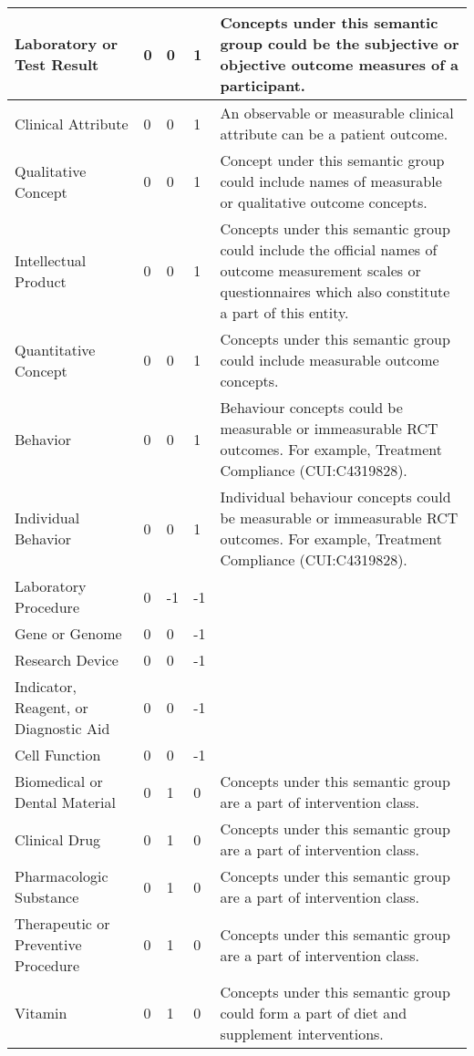 \documentclass[10.7pt,]{article}
\begin{document}
\begin{longtable}{|l|p{0.3cm}|p{0.3cm}|p{0.3cm}|p{7.9cm}|}
        Laboratory or Test Result & 0 & 0 & 1 & Concepts under this semantic group could be the subjective or objective outcome measures of a participant. \\ \hline
        Clinical Attribute & 0 & 0 & 1 & An observable or measurable clinical attribute can be a patient outcome. \\ \hline
        Qualitative Concept & 0 & 0 & 1 & Concept under this semantic group could include names of measurable or qualitative outcome concepts. \\ \hline
        Intellectual Product & 0 & 0 & 1 & Concepts under this semantic group could include the official names of outcome measurement scales or questionnaires which also constitute a part of this entity. \\ \hline
        Quantitative Concept & 0 & 0 & 1 & Concepts under this semantic group could include measurable outcome concepts. \\ \hline
        Behavior & 0 & 0 & 1 & Behaviour concepts could be measurable or immeasurable RCT outcomes. For example, Treatment Compliance (CUI:C4319828). \\ \hline
        Individual Behavior & 0 & 0 & 1 & Individual behaviour concepts could be measurable or immeasurable RCT outcomes. For example, Treatment Compliance (CUI:C4319828). \\ \hline
        Laboratory Procedure & 0 & -1 & -1 & ~ \\ \hline
        Gene or Genome & 0 & 0 & -1 & ~ \\ \hline
        Research Device & 0 & 0 & -1 & ~ \\ \hline
        Indicator, Reagent, or Diagnostic Aid & 0 & 0 & -1 & ~ \\ \hline
        Cell Function & 0 & 0 & -1 & ~ \\ \hline
        Biomedical or Dental Material & 0 & 1 & 0 & Concepts under this semantic group are a part of intervention class. \\ \hline
        Clinical Drug & 0 & 1 & 0 & Concepts under this semantic group are a part of intervention class. \\ \hline
        Pharmacologic Substance & 0 & 1 & 0 & Concepts under this semantic group are a part of intervention class. \\ \hline
        Therapeutic or Preventive Procedure & 0 & 1 & 0 & Concepts under this semantic group are a part of intervention class. \\ \hline
        Vitamin & 0 & 1 & 0 & Concepts under this semantic group could form a part of diet and supplement interventions. \\ \hline

\end{longtable}
\end{document}
